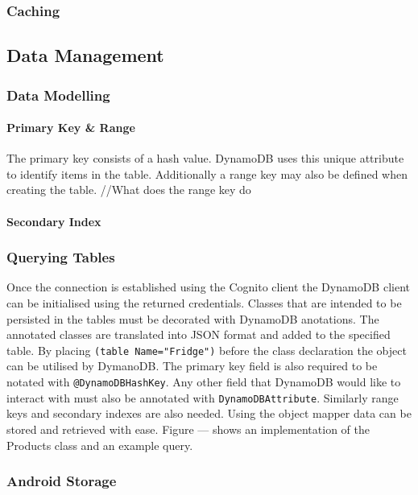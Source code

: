 \documentclass[a4paper, 11pt]{article}
\begin{document}
\subsubsection{Caching}

\subsection{Data Management}

\subsubsection{Data Modelling}
\paragraph{Primary Key \& Range}
The primary key consists of a hash value. DynamoDB uses this unique attribute to identify items in the table. Additionally a range key may also be defined when creating the table. //What does the range key do

\paragraph{Secondary Index}


\subsubsection{Querying Tables}
Once the connection is established using the Cognito client the DynamoDB client can be initialised using the returned credentials. Classes that are intended to be persisted in the tables must be decorated with DynamoDB anotations. The annotated classes are translated into JSON format and added to the specified table. By placing \texttt{\@DynamoDBTable(table Name="Fridge")} before the class declaration the object can be utilised by DymanoDB. The primary key field is also required to be notated with \texttt{@DynamoDBHashKey}. Any other field that DynamoDB would like to interact with must also be annotated with \texttt{DynamoDBAttribute}. Similarly range keys and secondary indexes are also needed. Using the object mapper data can be stored and retrieved with ease. Figure --- shows an implementation of the Products class and an example query.

\subsubsection{Android Storage}
\end{document}
